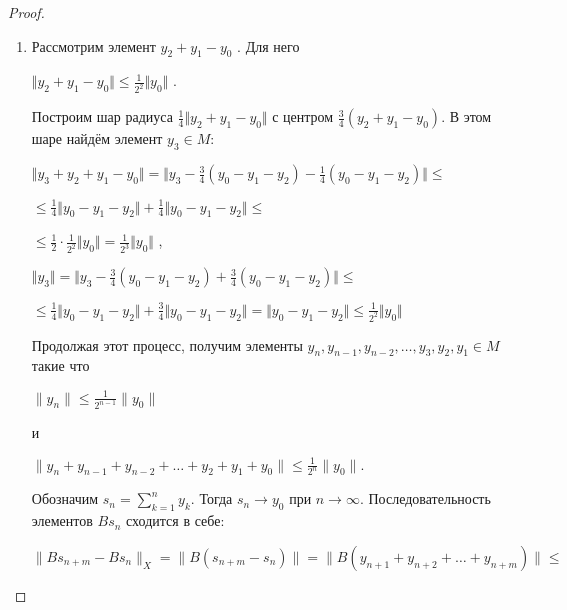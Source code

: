 \documentclass[12pt,a4paper,titlepage,oneside]{book}
\theoremstyle{definition}
\theoremstyle{plain}
\theoremstyle{break}
\theoremstyle{remark}
\theoremstyle{remark}
\theoremstyle{remark}
\theoremstyle{remark}
\theoremstyle{plain}
\theoremstyle{plain}
\begin{document}
\begin{proof}
\begin{enumerate}
	\item Рассмотрим элемент $y_2+y_1- y_0$ . Для него 	\begin{center}	
	$\Vert y_2+y_1- y_0 \Vert \leqslant
	\frac{1}{2^2} \Vert y_0 \Vert$ .
	\end{center}
	Построим шар радиуса
	$\frac{1}{4} \Vert y_2 + y_1 - y_0 \Vert$      	с центром $\frac{3}{4}(y_2 + y_1 - y_0)$.
	В этом шаре найдём элемент 	$y_3 \in M$:
	\begin{center}
	$\Vert y_3 + y_2 + y_1 - y_0 \Vert =
	\Vert y_3 - \frac{3}{4}(y_0 - y_1 - y_2) -
	\frac{1}{4}(y_0 - y_1 - y_2) \Vert \leqslant $
	\end{center}
	\begin{center}
	$\leqslant \frac{1}{4} \Vert y_0 - y_1 - y_2 \Vert +
	\frac{1}{4} \Vert y_0 - y_1 - y_2 \Vert 			\leqslant $
	\end{center}
	\begin{center}
	$ \leqslant\frac{1}{2} \cdot
	\frac{1}{2^2} \Vert y_0 \Vert =
	\frac{1}{2^3} \Vert y_0 \Vert$ ,
	\end{center}
	\begin{center}
	$\Vert y_3 \Vert =
	\Vert y_3 - \frac{3}{4}(y_0 - y_1 - y_2) +
	\frac{3}{4}(y_0 - y_1 - y_2) \Vert \leqslant $
	\end{center}
	\begin{center}
	$\leqslant \frac{1}{4} \Vert y_0 - y_1 - y_2 				\Vert +
	\frac{3}{4} \Vert y_0 - y_1 - y_2 \Vert =
	 \Vert y_0 - y_1 - y_2 \Vert \leqslant
	 \frac{1}{2^2} \Vert y_0 \Vert$
	\end{center}

Продолжая этот процесс, получим элементы $y_n, y_{n-1}, y_{n-2}, \ldots, y_3, y_2, y_1 \in M$ такие что 

\begin{center}
$\lVert y_n \rVert \leqslant \frac{1}{2^{n-1}} \lVert y_0 \rVert$

и

$\lVert y_n + y_{n-1}+y_{n-2}+\ldots+y_2+y_1+y_0 \rVert \leqslant \frac{1}{2^n} \lVert y_0 \rVert.$
\end{center}

Обозначим $s_n= \displaystyle\sum\limits_{k=1}^n y_k$. Тогда $s_n \to y_0$ при $n \to \infty$. Последовательность элементов $B s_n$ сходится в себе:

\begin{center}
$ \lVert B s_{n+m}-B s_n \rVert _X = \lVert B(s_{n+m}-s_n) \rVert= \lVert B(y_{n+1}+y_{n+2}+\ldots+y_{n+m}) \rVert \leqslant $
\end{center}


\end{enumerate}
\end{proof}
\end{document}
